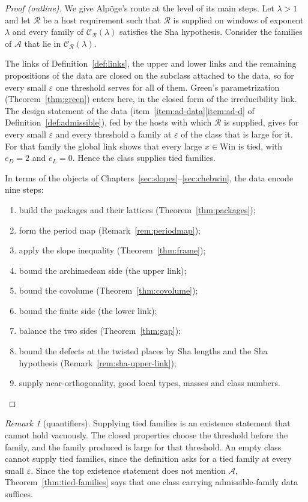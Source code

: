 \documentclass[11pt]{amsbook}
\theoremstyle{plain}
\theoremstyle{definition}
\theoremstyle{remark}
\newtheorem{remark}[theorem]{Remark}
\numberwithin{equation}{section}
\numberwithin{figure}{chapter}
\numberwithin{table}{chapter}
\newcommand{\eps}{\varepsilon}
\newcommand{\Win}{\mathrm{Win}}
\begin{document}
\begin{proof}[Proof (outline)]
We give Alp\"oge's route at the level of its main steps.
Let $\lambda>1$ and let $\mathscr R$ be a host requirement such that
$\mathscr R$ is supplied on windows of exponent $\lambda$ and every family of
$\mathcal C_{\mathscr R}(\lambda)$ satisfies the Sha hypothesis.
Consider the families of $\mathcal A$ that lie in
$\mathcal C_{\mathscr R}(\lambda)$.

The links of Definition~\ref{def:links}, the upper and lower links
and the remaining propositions of the data are closed on the subclass
attached to the data, so for every small $\eps$ one threshold serves
for all of them. Green's
parametrization (Theorem~\ref{thm:green}) enters here, in the closed
form of the irreducibility link. The design statement of the data
(item~\ref{item:ad-data}\ref{item:ad-d} of
Definition~\ref{def:admissible}),
fed by the hosts with which $\mathscr R$ is supplied,
gives for every small $\eps$ and every threshold a family at $\eps$ of
the class that is large for it. For that family the global link shows
that every large $x\in\Win$ is tied, with $e_D=2$ and $e_L=0$. Hence
the class supplies tied families.

In terms of the objects of Chapters~\ref{sec:slopes}--\ref{sec:chebwin},
the data encode nine steps:
\begin{enumerate}[label=(\arabic*)]
\item build the packages and their lattices (Theorem~\ref{thm:packages});
\item form the period map (Remark~\ref{rem:periodmap});
\item apply the slope inequality (Theorem~\ref{thm:frame});
\item bound the archimedean side (the upper link);
\item bound the covolume (Theorem~\ref{thm:covolume});
\item bound the finite side (the lower link);
\item balance the two sides (Theorem~\ref{thm:gap});
\item bound the defects at the twisted places by Sha lengths and the
Sha hypothesis (Remark~\ref{rem:sha-upper-link});
\item supply near-orthogonality, good local types, masses and class
numbers.
\end{enumerate}
\end{proof}

\begin{remark}[quantifiers]\label{rem:quantifiers}
Supplying tied families is an existence statement that cannot hold
vacuously. The closed properties
choose the threshold before the family, and the family produced is
large for that threshold. An empty class cannot supply tied
families, since the definition asks for a tied family at every small $\eps$.
Since the
top existence statement does not mention $\mathcal A$,
Theorem~\ref{thm:tied-families} says that one class carrying
admissible-family data suffices.
\end{remark}
\end{document}
